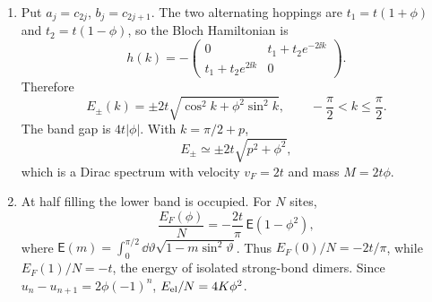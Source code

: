 \begin{enumerate}
  \begin{enumerate}
    \item[(a)] Put \(a_j=c_{2j}\), \(b_j=c_{2j+1}\).  The two alternating
      hoppings are \(t_1=t(1+\phi)\) and \(t_2=t(1-\phi)\), so the Bloch
      Hamiltonian is
      \[
        h(k)=-\begin{pmatrix}
          0&t_1+t_2e^{-2\ii k}\\
          t_1+t_2e^{2\ii k}&0
        \end{pmatrix}.
      \]
      Therefore
      \[
        \boxed{E_\pm(k)=\pm2t
          \sqrt{\cos^2k+\phi^2\sin^2k}},
        \qquad -\frac\pi2<k\leq\frac\pi2 .
      \]
      The band gap is \(4t|\phi|\).  With
      \(k=\pi/2+p\),
      \[
        E_\pm\simeq\pm2t\sqrt{p^2+\phi^2},
      \]
      which is a Dirac spectrum with velocity \(v_F=2t\) and mass
      \(M=2t\phi\).
    \item[(b)] At half filling the lower band is occupied.  For \(N\)
      sites,
      \[
        \frac{E_F(\phi)}N
          =-\frac{2t}{\pi}\,
            \mathsf E(1-\phi^2),
      \]
      where
      \(\mathsf E(m)=\int_0^{\pi/2}\dd\vartheta
      \sqrt{1-m\sin^2\vartheta}\).
      Thus \(E_F(0)/N=-2t/\pi\), while
      \(E_F(1)/N=-t\), the energy of isolated strong-bond dimers.
      Since \(u_n-u_{n+1}=2\phi(-1)^n\),
      \(E_{\rm el}/N=4K\phi^2\).


\end{enumerate}
\end{enumerate}
